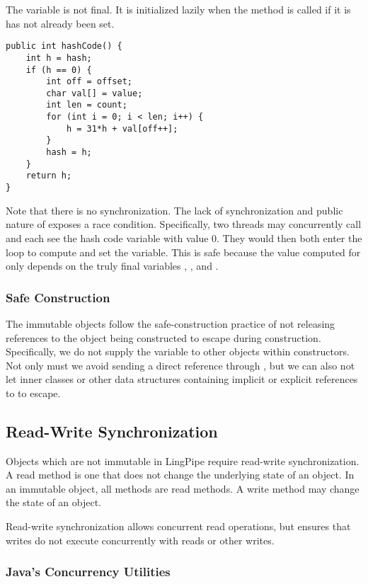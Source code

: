 The  variable is not final.  It is initialized lazily when
the  method is called if it is has not already been
set.
%
\begin{verbatim}
public int hashCode() {
    int h = hash;
    if (h == 0) {
        int off = offset;
        char val[] = value;
        int len = count;
        for (int i = 0; i < len; i++) {
            h = 31*h + val[off++];
        }
        hash = h;
    }
    return h;
}
\end{verbatim}
%
Note that there is no synchronization.  The lack of synchronization
and public nature of  exposes a race condition.
Specifically, two threads may concurrently call  and
each see the hash code variable  with value 0.  They would
then both enter the loop to compute and set the variable.  This is
safe because the value computed for  only depends on
the truly final variables , , and .


\subsubsection{Safe Construction}

The immutable objects follow the safe-construction practice of not
releasing references to the object being constructed to escape during
construction.  Specifically, we do not supply the  variable
to other objects within constructors.  Not only must we avoid sending
a direct reference through , but we can also not let inner
classes or other data structures containing implicit or explicit
references to  to escape.


\subsection{Read-Write Synchronization}\label{section:java-read-write-synchronization}

Objects which are not immutable in LingPipe require read-write
synchronization.  A read method is one that does not change the
underlying state of an object.  In an immutable object, all methods
are read methods.  A write method may change the state of an object.

Read-write synchronization allows concurrent read operations, but ensures
that writes do not execute concurrently with reads or other writes.

\subsubsection{Java's Concurrency Utilities}

